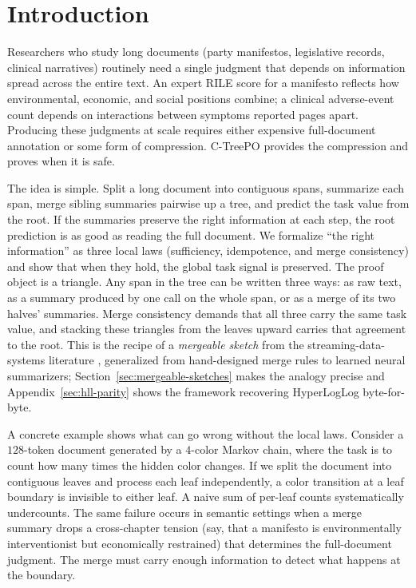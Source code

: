\section{Introduction}\label{sec:introduction}

Researchers who study long documents (party manifestos, legislative records, clinical narratives) routinely need a single judgment that depends on information spread across the entire text. An expert RILE score for a manifesto reflects how environmental, economic, and social positions combine; a clinical adverse-event count depends on interactions between symptoms reported pages apart. Producing these judgments at scale requires either expensive full-document annotation or some form of compression. C-TreePO provides the compression and proves when it is safe.

The idea is simple. Split a long document into contiguous spans, summarize each span, merge sibling summaries pairwise up a tree, and predict the task value from the root. If the summaries preserve the right information at each step, the root prediction is as good as reading the full document. We formalize ``the right information'' as three local laws (sufficiency, idempotence, and merge consistency) and show that when they hold, the global task signal is preserved. The proof object is a triangle. Any span in the tree can be written three ways: as raw text, as a summary produced by one call on the whole span, or as a merge of its two halves' summaries. Merge consistency demands that all three carry the same task value, and stacking these triangles from the leaves upward carries that agreement to the root. This is the recipe of a \emph{mergeable sketch} from the streaming-data-systems literature \citep{Agarwal2013MergeableTODS}, generalized from hand-designed merge rules to learned neural summarizers; Section~\ref{sec:mergeable-sketches} makes the analogy precise and Appendix~\ref{sec:hll-parity} shows the framework recovering HyperLogLog byte-for-byte.

A concrete example shows what can go wrong without the local laws. Consider a $128$-token document generated by a $4$-color Markov chain, where the task is to count how many times the hidden color changes. If we split the document into contiguous leaves and process each leaf independently, a color transition at a leaf boundary is invisible to either leaf. A naive sum of per-leaf counts systematically undercounts. The same failure occurs in semantic settings when a merge summary drops a cross-chapter tension (say, that a manifesto is environmentally interventionist but economically restrained) that determines the full-document judgment. The merge must carry enough information to detect what happens at the boundary.

